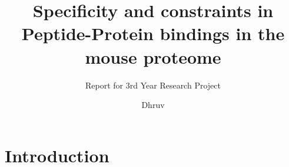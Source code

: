 \documentclass[a4paper, 12pt]{article}
\title{Specificity and constraints in Peptide-Protein bindings in the mouse proteome}
\subtitle{Report for 3rd Year Research Project}
\author{Dhruv \bsc{Sharma} }
\begin{document}
\maketitle
\pagebreak
\tableofcontents
\pagebreak
\part*{Introduction}
\end{document}

